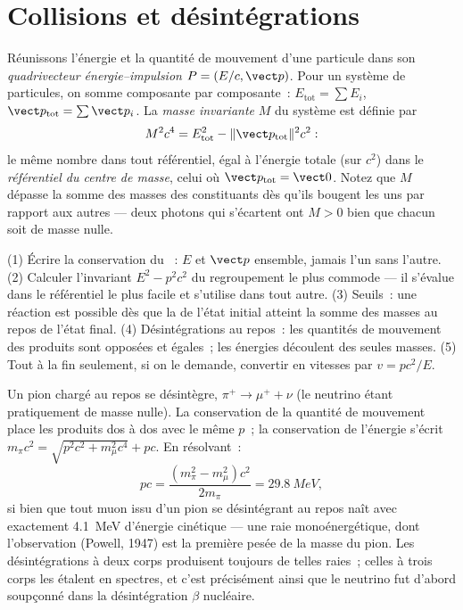 \section{Collisions et désintégrations}

\begin{definition}\label{def:b3:relativistic-dynamics:four-momentum}
Réunissons l'énergie et la quantité de mouvement d'une particule dans
son \emph{quadrivecteur énergie--impulsion} $P = (E/c, \vect p)$. Pour
un système de particules, on somme composante par composante~:
$E_{\text{tot}} = \sum E_i$, $\vect p_{\text{tot}} = \sum\vect p_i$.
La \emph{masse invariante} $M$ du système est définie par
\[
M^2c^4 = E_{\text{tot}}^2 - \|\vect p_{\text{tot}}\|^2c^2 :
\]
le même nombre dans tout référentiel, égal à l'énergie totale (sur
$c^2$) dans le \emph{référentiel du centre de masse}, celui où
$\vect p_{\text{tot}} = \vect 0$. Notez que $M$ dépasse la somme des
masses des constituants dès qu'ils bougent les uns par rapport aux
autres --- deux photons qui s'écartent ont $M > 0$ bien que chacun soit
de masse nulle.
\end{definition}

\begin{method}\label{met:b3:relativistic-dynamics:method}
(1) Écrire la conservation du ~: $E$ et
$\vect p$ ensemble, jamais l'un sans l'autre. (2) Calculer l'invariant
$E^2 - p^2c^2$ du regroupement le plus commode --- il s'évalue dans le
référentiel le plus facile et s'utilise dans tout autre. (3) Seuils~:
une réaction est possible dès que la  de l'état initial
atteint la somme des masses au repos de l'état final. (4)
Désintégrations au repos~: les quantités de mouvement des produits sont
opposées et égales~; les énergies découlent des seules masses. (5) Tout
à la fin seulement, si on le demande, convertir en vitesses par
$v = pc^2/E$.
\end{method}

\begin{example}\label{ex:b3:relativistic-dynamics:pion}
Un pion chargé au repos se désintègre, $\pi^+ \to \mu^+ + \nu$ (le
neutrino étant pratiquement de masse nulle). La conservation de la
quantité de mouvement place les produits dos à dos avec le même $p$~;
la conservation de l'énergie s'écrit $m_\pi c^2 =
\sqrt{p^2c^2 + m_\mu^2c^4} + pc$. En résolvant~:
\[
pc = \frac{(m_\pi^2 - m_\mu^2)c^2}{2m_\pi} = \qty{29.8}{MeV} ,
\]
si bien que tout muon issu d'un pion se désintégrant au repos naît avec
exactement \qty{4.1}{MeV} d'énergie cinétique --- une raie
monoénergétique, dont l'observation (Powell, 1947) est la première
pesée de la masse du pion. Les désintégrations à deux corps produisent
toujours de telles raies~; celles à trois corps les étalent en
spectres, et c'est précisément ainsi que le neutrino fut d'abord
soupçonné dans la désintégration $\beta$ nucléaire.
\end{example}


